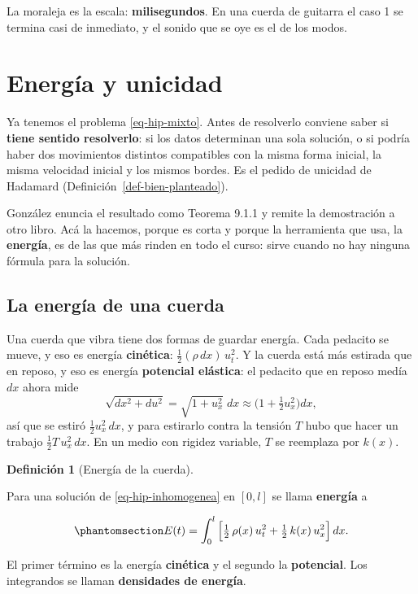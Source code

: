 \documentclass[
  spanish,
  a4paper,
]{scrbook}
\theoremstyle{definition}
\newtheorem{definition}{Definición}[chapter]
\theoremstyle{plain}
\theoremstyle{definition}
\theoremstyle{plain}
\theoremstyle{definition}
\theoremstyle{remark}
\begin{document}
La moraleja es la escala: \textbf{milisegundos}. En una cuerda de
guitarra el caso 1 se termina casi de inmediato, y el sonido que se oye
es el de los modos.

\section{Energía y unicidad}\label{sec-hip-energia}

Ya tenemos el problema \ref{eq-hip-mixto}. Antes de resolverlo conviene
saber si \textbf{tiene sentido resolverlo}: si los datos determinan una
sola solución, o si podría haber dos movimientos distintos compatibles
con la misma forma inicial, la misma velocidad inicial y los mismos
bordes. Es el pedido de unicidad de Hadamard
(Definición~\ref{def-bien-planteado}).

González enuncia el resultado como Teorema 9.1.1 y remite la
demostración a otro libro. Acá la hacemos, porque es corta y porque la
herramienta que usa, la \textbf{energía}, es de las que más rinden en
todo el curso: sirve cuando no hay ninguna fórmula para la solución.

\subsection{La energía de una cuerda}\label{sec-hip-energia-def}

Una cuerda que vibra tiene dos formas de guardar energía. Cada pedacito
se mueve, y eso es energía \textbf{cinética}:
\(\tfrac12(\rho\,dx)\,u_t^2\). Y la cuerda está más estirada que en
reposo, y eso es energía \textbf{potencial elástica}: el pedacito que en
reposo medía \(dx\) ahora mide \[
\sqrt{dx^2 + du^2} = \sqrt{1+u_x^2}\;dx \approx \Big(1 + \tfrac12u_x^2\Big)dx ,
\] así que se estiró \(\tfrac12u_x^2\,dx\), y para estirarlo contra la
tensión \(T\) hubo que hacer un trabajo \(\tfrac12T\,u_x^2\,dx\). En un
medio con rigidez variable, \(T\) se reemplaza por \(k(x)\).

\begin{definition}[Energía de la
cuerda]\protect\hypertarget{def-hip-energia}{}\label{def-hip-energia}

Para una solución de \ref{eq-hip-inhomogenea} en \([0,l]\) se llama
\textbf{energía} a

\begin{equation}\protect\phantomsection\label{eq-hip-energia}{
E(t) = \int_0^l \Big[\tfrac12\,\rho(x)\,u_t^2 + \tfrac12\,k(x)\,u_x^2\Big]\,dx .
}\end{equation}

El primer término es la energía \textbf{cinética} y el segundo la
\textbf{potencial}. Los integrandos se llaman \textbf{densidades de
energía}.

\end{definition}
\end{document}
